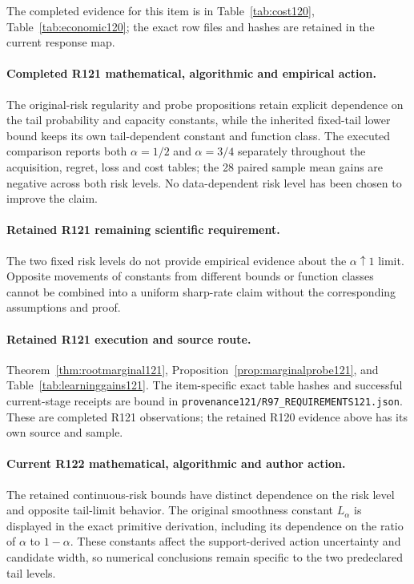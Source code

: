 The completed evidence for this item is in Table~\ref{tab:cost120}, Table~\ref{tab:economic120}; the exact row files and hashes are retained in the current response map.

\paragraph{Completed R121 mathematical, algorithmic and empirical action.}
The original-risk regularity and probe propositions retain explicit dependence on the tail probability and capacity constants, while the inherited fixed-tail lower bound keeps its own tail-dependent constant and function class. The executed comparison reports both $\alpha=1/2$ and $\alpha=3/4$ separately throughout the acquisition, regret, loss and cost tables; the 28 paired sample mean gains are negative across both risk levels. No data-dependent risk level has been chosen to improve the claim.

\paragraph{Retained R121 remaining scientific requirement.}
The two fixed risk levels do not provide empirical evidence about the $\alpha\uparrow1$ limit. Opposite movements of constants from different bounds or function classes cannot be combined into a uniform sharp-rate claim without the corresponding assumptions and proof.

\paragraph{Retained R121 execution and source route.}
Theorem~\ref{thm:rootmarginal121}, Proposition~\ref{prop:marginalprobe121}, and Table~\ref{tab:learninggains121}.
The item-specific exact table hashes and successful current-stage receipts are bound in \nolinkurl{provenance121/R97_REQUIREMENTS121.json}. These are completed R121 observations; the retained R120 evidence above has its own source and sample.
\paragraph{Current R122 mathematical, algorithmic and author action.}
The retained continuous-risk bounds have distinct dependence on the risk level and opposite tail-limit behavior. The original smoothness constant $L_\alpha$ is displayed in the exact primitive derivation, including its dependence on the ratio of $\alpha$ to $1-\alpha$. These constants affect the support-derived action uncertainty and candidate width, so numerical conclusions remain specific to the two predeclared tail levels.

